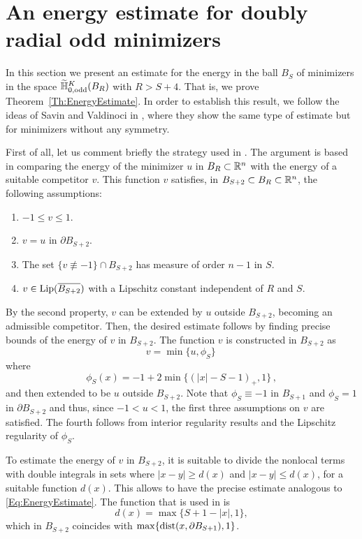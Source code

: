 \section{An energy estimate for doubly radial odd minimizers}
\label{Sec:EnergyEstimate}

In this section we present an estimate for the energy in the ball $B_S$ of minimizers in the space $\widetilde{\mathbb{H}}^K_{0, \mathrm{odd}}(B_R)$ with $R > S+ 4$. That is, we prove Theorem~\ref{Th:EnergyEstimate}. In order to establish this result, we follow the ideas of Savin and Valdinoci in \cite{SavinValdinoci-EnergyEstimate}, where they show the same type of estimate but for minimizers without any symmetry.


First of all, let us comment briefly the strategy used in \cite{SavinValdinoci-EnergyEstimate}. The argument is based in comparing the energy of the minimizer $u$ in $B_R\subset \mathbb{R}^n$ with the energy of a suitable competitor $v$. This function $v$ satisfies, in $B_{S+2}\subset B_R \subset \mathbb{R}^n$, the following assumptions:
\begin{enumerate}[label=(\textit{\roman*})]
	\item $-1 \leq v \leq 1$.
	\item $v=u$ in $\partial B_{S+2}$.
	\item The set $\{v\not \equiv -1\}\cap B_{S+2}$ has measure of order $n-1$ in $S$.
	\item $v\in \mathrm{Lip}(\overline{B_{S+2}})$ with a Lipschitz constant independent of $R$ and $S$.
\end{enumerate} 
By the second property, $v$ can be extended by $u$ outside $B_{S+2}$, becoming an admissible competitor. Then, the desired estimate follows by finding precise bounds of the energy of $v$ in $B_{S+2}$. The function $v$ is constructed in $B_{S+2}$ as
$$
v = \min \{u, \phi_S\}\,
$$
where
\begin{equation}
\label{Eq:DefPhiS}
\phi_S (x) =-1+2\min\{(|x|-S-1)_+,1\}\,,
\end{equation}
and then extended to be $u$ outside $B_{S+2}$. Note that $\phi_S \equiv -1$ in $B_{S+1}$ and $\phi_S = 1$ in $\partial B_{S+2}$ and thus, since $-1<u<1$, the first three assumptions on $v$ are satisfied. The fourth follows from interior regularity results and the Lipschitz regularity of $\phi_S$.

To estimate the energy of $v$ in $B_{S+2}$, it is suitable to divide the nonlocal terms with double integrals in sets where $|x-y|\geq d(x)$ and $|x-y|\leq d(x)$, for a suitable function $d(x)$. This allows to have the precise estimate analogous to \eqref{Eq:EnergyEstimate}. The function that is used in \cite{SavinValdinoci-EnergyEstimate} is 
\begin{equation}
\label{Eq:DefdSavinValdinoci}
d (x) = \max \{S+1-|x| , 1\},
\end{equation}
which in $B_{S+2}$ coincides with $\max\{ \operatorname{dist} (x, \partial B_{S+1}), 1\}$.


